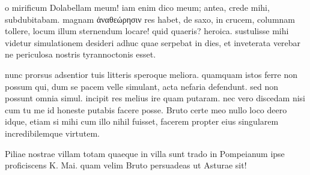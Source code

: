 


 o mirificum Dolabellam meum! iam enim dico meum; antea, crede mihi, subdubitabam. magnam ἀναθεώρησιν res habet, de saxo, in crucem, columnam tollere, locum illum sternendum locare! quid quaeris? heroica. sustulisse mihi videtur simulationem desideri adhuc quae serpebat in dies, et inveterata verebar ne periculosa nostris tyrannoctonis esset.

 nunc prorsus adsentior tuis litteris speroque meliora. quamquam istos ferre non possum qui, dum se pacem velle simulant, acta nefaria defendunt. sed non possunt omnia simul. incipit res melius ire quam putaram. nec vero discedam nisi cum tu me id honeste putabis facere posse. Bruto certe meo nullo loco deero idque, etiam si mihi cum illo nihil fuisset, facerem propter eius singularem incredibilemque virtutem.

 Piliae nostrae villam totam quaeque in villa sunt trado in Pompeianum ipse proficiscens K. Mai. quam velim Bruto persuadeas ut Asturae sit!
